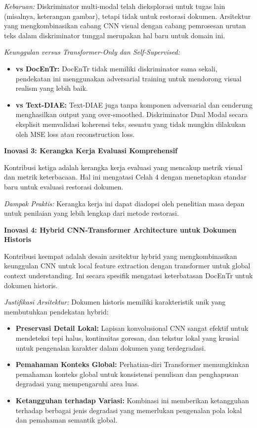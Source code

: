 \documentclass[12pt,a4paper]{article}
\begin{document}
\textit{Kebaruan:} Diskriminator multi-modal telah dieksplorasi untuk tugas lain (misalnya, keterangan gambar), tetapi tidak untuk restorasi dokumen. Arsitektur yang mengkombinasikan cabang CNN visual dengan cabang pemrosesan urutan teks dalam diskriminator tunggal merupakan hal baru untuk domain ini.

\textit{Keunggulan versus Transformer-Only dan Self-Supervised:}
\begin{itemize}
    \item \textbf{vs DocEnTr:} DocEnTr tidak memiliki diskriminator sama sekali, pendekatan ini menggunakan adversarial training untuk mendorong visual realism yang lebih baik.
    \item \textbf{vs Text-DIAE:} Text-DIAE juga tanpa komponen adversarial dan cenderung menghasilkan output yang over-smoothed. Diskriminator Dual Modal secara eksplisit memvalidasi koherensi teks, sesuatu yang tidak mungkin dilakukan oleh MSE loss atau reconstruction loss.
\end{itemize}

\textbf{Inovasi 3: Kerangka Kerja Evaluasi Komprehensif}

Kontribusi ketiga adalah kerangka kerja evaluasi yang mencakup metrik visual dan metrik keterbacaan. Hal ini mengatasi Celah 4 dengan menetapkan standar baru untuk evaluasi restorasi dokumen.

\textit{Dampak Praktis:} Kerangka kerja ini dapat diadopsi oleh penelitian masa depan untuk penilaian yang lebih lengkap dari metode restorasi.

\textbf{Inovasi 4: Hybrid CNN-Transformer Architecture untuk Dokumen Historis}

Kontribusi keempat adalah desain arsitektur hybrid yang mengkombinasikan keunggulan CNN untuk local feature extraction dengan transformer untuk global context understanding. Ini secara spesifik mengatasi keterbatasan DocEnTr untuk dokumen historis.

\textit{Justifikasi Arsitektur:} Dokumen historis memiliki karakteristik unik yang membutuhkan pendekatan hybrid:

\begin{itemize}
    \item \textbf{Preservasi Detail Lokal:} Lapisan konvolusional CNN sangat efektif untuk mendeteksi tepi halus, kontinuitas goresan, dan tekstur lokal yang krusial untuk pengenalan karakter dalam dokumen yang terdegradasi.

    \item \textbf{Pemahaman Konteks Global:} Perhatian-diri Transformer memungkinkan pemahaman konteks global untuk konsistensi penulisan dan penghapusan degradasi yang mempengaruhi area luas.

    \item \textbf{Ketangguhan terhadap Variasi:} Kombinasi ini memberikan ketangguhan terhadap berbagai jenis degradasi yang memerlukan pengenalan pola lokal dan pemahaman semantik global.
\end{itemize}
\end{document}
